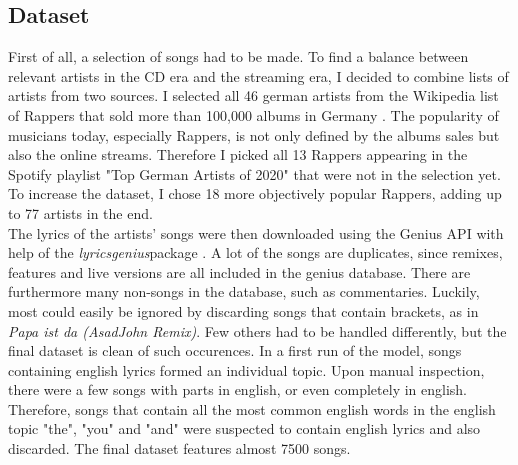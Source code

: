 \documentclass[conference]{IEEEtran}
\begin{document}
\subsection{Dataset}
First of all, a selection of songs had to be made. To find a balance between relevant artists in the CD era and the streaming era, I decided to combine lists of artists from two sources. I selected all 46 german artists from the Wikipedia list of Rappers that sold more than 100,000 albums in Germany \cite{wiki_albums}. The popularity of musicians today, especially Rappers, is not only defined by the albums sales but also the online streams. Therefore I picked all 13 Rappers appearing in the Spotify playlist "Top German Artists of 2020" \cite{spotify_2020} that were not in the selection yet. To increase the dataset, I chose 18 more objectively popular Rappers, adding up to 77 artists in the end.\\
The lyrics of the artists' songs were then downloaded using the Genius API \cite{genius} with help of the \textit{lyricsgenius}package \cite{lyricsgenius}. A lot of the songs are duplicates, since remixes, features and live versions are all included in the genius database. There are furthermore many non-songs in the database, such as commentaries. Luckily, most could easily be ignored by discarding songs that contain brackets, as in \textit{Papa ist da (AsadJohn Remix)}. Few others had to be handled differently, but the final dataset is clean of such occurences. In a first run of the model, songs containing english lyrics formed an individual topic. Upon manual inspection, there were a few songs with parts in english, or even completely in english. Therefore, songs that contain all the most common english words in the english topic "the", "you" and "and" were suspected to contain english lyrics and also discarded. The final dataset features almost 7500 songs.
\end{document}

